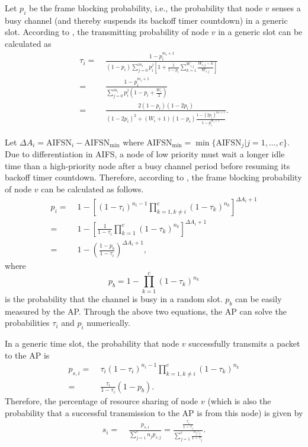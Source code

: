 \documentclass[conference]{IEEEtran}
\begin{document}
Let $p_i$ be the frame blocking probability, i.e., the probability that node $v$ senses a busy channel (and thereby suspends its backoff timer countdown) in a generic slot. According to \cite{xiao2005performance}, the transmitting probability of node $v$ in a generic slot can be calculated as
\begin{align}\label{eq:taui}
\nonumber \tau_i =&\; \frac{1-p_i^{m_i+1}}{(1-p_i)\sum^{m_i}_{j=0}p_i^j
                    \left[1+\frac{1}{1-p_{i}}\sum^{W_{i,j}}_{k=1}\frac{W_{i,j}-k}{W_{i,j}}\right]}\\
\nonumber  =&\; \frac{1-p_i^{m_i+1}}{\sum^{m_i}_{j=0}p_i^j\left(1-p_i+\frac{W_{i}}{2}\right)}\\
           =&\; \frac{2(1-p_i)(1-2p_i)}{(1-2p_i)^2+(W_{i}+1)(1-p_i)\frac{1-(2p_i)^{m_i+1}}{1-p_i^{m_i+1}}}.
\end{align}


Let $\Delta A_i = \textrm{AIFSN}_i-\textrm{AIFSN}_{\min}$ where $\textrm{AIFSN}_{\min}=\min\{\textrm{AIFSN}_j|j=1,\ldots,c\}$. Due to differentiation in AIFS, a node of low priority must wait a longer idle time than a high-priority node after a busy channel period before resuming its backoff timer countdown. Therefore, according to \cite{kosek2011simple}, the frame blocking probability of node $v$ can be calculated as follows.
\begin{align}\label{eq:pi}
\nonumber  p_i = &\; 1-\left[(1-\tau_i)^{n_i-1}\prod^{c}_{k=1,k\neq i}(1-\tau_k)^{n_k}\right]^{\Delta A_i+1}\\
\nonumber  = &\; 1-\left[\frac{1}{1-\tau_i}\prod^{c}_{k=1}(1-\tau_k)^{n_k}\right]^{\Delta A_i+1}\\
        = &\; 1-\left(\frac{1-p_b}{1-\tau_i}\right)^{\Delta A_i+1},
\end{align}
where
\begin{equation}
    p_b=1-\prod^{c}_{k=1}(1-\tau_k)^{n_k}
\end{equation}
is the probability that the channel is busy in a random slot. $p_b$ can be easily measured by the AP. Through the above two equations, the AP can solve the probabilities $\tau_i$ and $p_i$ numerically. 

In a generic time slot, the probability that node $v$ successfully transmits a packet to the AP is
\begin{align}
\nonumber p_{s,i} =&\; \tau_i(1-\tau_i)^{n_i-1}\prod^{c}_{k=1,k\neq i}(1-\tau_k)^{n_k}\\
            =&\; \frac{\tau_i}{1-\tau_i}(1-p_b).
\end{align}
Therefore, the percentage of resource sharing of node $v$ (which is also the probability that a successful transmission to the AP is from this node) is given by
\begin{align}\label{eq:si}
 s_i =&\; \frac{p_{s,i}}{\sum^{c}_{j=1}n_jp_{s,j}}= \frac{\frac{\tau_i}{1-\tau_i}}{\sum^{c}_{j=1}\frac{n_j\tau_j}{1-\tau_j}}.
\end{align}
\end{document}
